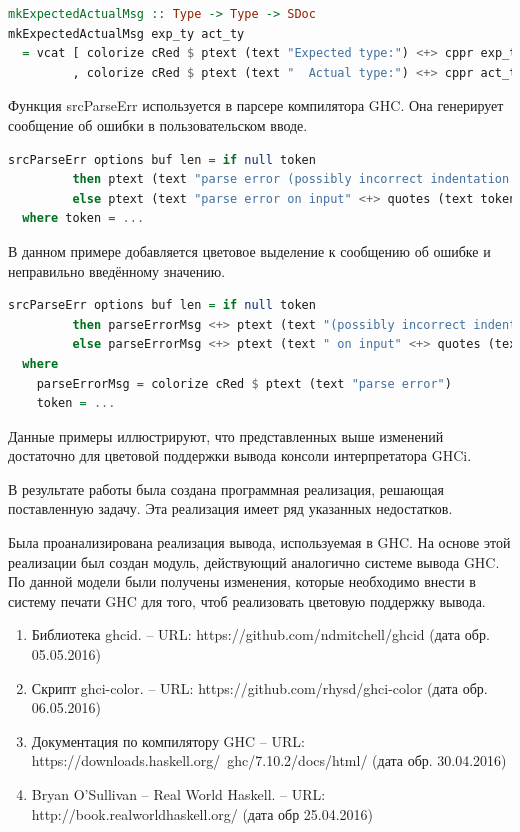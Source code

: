 \begin{lstlisting}[language=Haskell, caption=Реализация функции с изменениями]
mkExpectedActualMsg :: Type -> Type -> SDoc
mkExpectedActualMsg exp_ty act_ty
  = vcat [ colorize cRed $ ptext (text "Expected type:") <+> cppr exp_ty
         , colorize cRed $ ptext (text "  Actual type:") <+> cppr act_ty ]
\end{lstlisting}

Функция srcParseErr используется в парсере компилятора GHC. Она генерирует сообщение об ошибки в пользовательском вводе.

\begin{lstlisting}[language=Haskell]
srcParseErr options buf len = if null token
         then ptext (text "parse error (possibly incorrect indentation or mismatched brackets)")
         else ptext (text "parse error on input" <+> quotes (text token))
  where token = ...    
\end{lstlisting}

В данном примере добавляется цветовое выделение к сообщению об ошибке и неправильно введённому значению.

\begin{lstlisting}[language=Haskell]
srcParseErr options buf len = if null token
         then parseErrorMsg <+> ptext (text "(possibly incorrect indentation or mismatched brackets)")
         else parseErrorMsg <+> ptext (text " on input" <+> quotes (text token))
  where 
    parseErrorMsg = colorize cRed $ ptext (text "parse error")
    token = ...    
\end{lstlisting}

Данные примеры иллюстрируют, что представленных выше изменений достаточно для цветовой поддержки вывода консоли интерпретатора GHCi.

\Conc
В результате работы была создана программная реализация, решающая поставленную задачу. Эта реализация имеет ряд указанных недостатков.

Была проанализирована реализация вывода, используемая в GHC. На основе этой реализации был создан модуль, действующий аналогично системе вывода GHC. По данной модели были получены изменения, которые необходимо внести в систему печати GHC для того, чтоб реализовать цветовую поддержку вывода.

\begin{enumerate}
  \item Библиотека ghcid. -- URL: https://github.com/ndmitchell/ghcid (дата обр. 05.05.2016)
  \item Скрипт ghci-color. -- URL: https://github.com/rhysd/ghci-color (дата обр. 06.05.2016)
  \item Документация по компилятору GHC -- URL: https://downloads.haskell.org/~ghc/7.10.2/docs/html/ (дата обр. 30.04.2016)
  \item Bryan O'Sullivan -- Real World Haskell. -- URL: http://book.realworldhaskell.org/ (дата обр 25.04.2016)
\end{enumerate}


